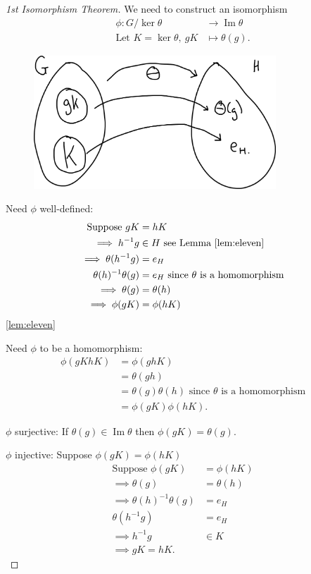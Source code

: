 \begin{proof}[1st Isomorphism Theorem]
We need to construct an isomorphism
\begin{align*}
    \phi : G / \ker \theta &\to \operatorname{Im} \theta \\
    \text{Let } K = \ker \theta,\ gK &\mapsto \theta(g).
\end{align*}

\begin{figure}

{\centering \includegraphics[height=5cm]{figures/04-iso-thm} 

}

\end{figure}

Need \(\phi\) well-defined:
\begin{align*}
    \text{Suppose } gK &= hK \\
    \implies h^{-1}g &\in H \text{ see Lemma \ref{lem:eleven}} \\
    \implies \theta(h^{-1}g) &= e_H \\
    \theta(h)^{-1} \theta(g) &= e_H \text{ since $\theta$ is a homomorphism} \\
    \implies \theta(g) &= \theta(h) \\
    \implies \phi(gK) &= \phi(hK)
\end{align*} \ref{lem:eleven}

Need \(\phi\) to be a homomorphism:
\begin{align*}
    \phi(gK hK) &= \phi(gh K) \\
    &= \theta(gh) \\
    &= \theta(g) \theta(h) \text{ since $\theta$ is a homomorphism} \\
    &= \phi(gK) \phi(hK).
\end{align*}

\(\phi\) surjective:
If \(\theta(g) \in \operatorname{Im} \theta\) then \(\phi(gK) = \theta(g)\).

\(\phi\) injective:
Suppose \(\phi(gK) = \phi(hK)\)
\begin{align*}
    \text{Suppose } \phi(gK) &= \phi(hK) \\
    \implies \theta(g) &= \theta(h) \\
    \implies \theta(h)^{-1} \theta(g) &= e_H \\
    \theta(h^{-1}g) &= e_H \\
    \implies h^{-1} g &\in K \\
    \implies gK = hK. 
\end{align*}
\end{proof}

